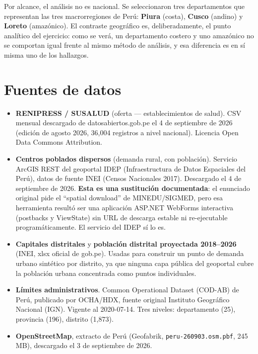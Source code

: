 \documentclass[11pt]{article}
\begin{document}
Por alcance, el an\'alisis no es nacional. Se seleccionaron tres
departamentos que representan las tres macrorregiones de Per\'u: \textbf{
Piura} (costa), \textbf{Cusco} (andino) y \textbf{Loreto} (amaz\'onico). El
contraste geogr\'afico es, deliberadamente, el punto anal\'itico del
ejercicio: como se ver\'a, un departamento costero y uno amaz\'onico no se
comportan igual frente al mismo m\'etodo de an\'alisis, y esa diferencia es
en s\'i misma uno de los hallazgos.

\section{Fuentes de datos}

\begin{itemize}
  \item \textbf{RENIPRESS / SUSALUD} (oferta --- establecimientos de
  salud). CSV mensual descargado de datosabiertos.gob.pe el 4 de
  septiembre de 2026 (edici\'on de agosto 2026, 36{,}004 registros a nivel
  nacional). Licencia Open Data Commons Attribution.
  \item \textbf{Centros poblados dispersos} (demanda rural, con
  poblaci\'on). Servicio ArcGIS REST del geoportal IDEP (Infraestructura de
  Datos Espaciales del Per\'u), datos de fuente INEI (Censos Nacionales
  2017). Descargado el 4 de septiembre de 2026. \textbf{Esta es una
  sustituci\'on documentada}: el enunciado original pide el ``spatial
  download'' de MINEDU/SIGMED, pero esa herramienta result\'o ser una
  aplicaci\'on ASP.NET WebForms interactiva (postbacks y ViewState) sin
  URL de descarga estable ni re-ejecutable program\'aticamente. El
  servicio del IDEP s\'i lo es.
  \item \textbf{Capitales distritales} y \textbf{poblaci\'on distrital
  proyectada 2018--2026} (INEI, xlsx oficial de gob.pe). Usadas para
  construir un punto de demanda urbano sint\'etico por distrito, ya que
  ninguna capa p\'ublica del geoportal cubre la poblaci\'on urbana
  concentrada como puntos individuales.
  \item \textbf{L\'imites administrativos}. Common Operational Dataset
  (COD-AB) de Per\'u, publicado por OCHA/HDX, fuente original Instituto
  Geogr\'afico Nacional (IGN). Vigente al 2020-07-14. Tres niveles:
  departamento (25), provincia (196), distrito (1{,}873).
  \item \textbf{OpenStreetMap}, extracto de Per\'u (Geofabrik,
  \texttt{peru-260903.osm.pbf}, 245\,MB), descargado el 3 de septiembre de
  2026.
\end{itemize}
\end{document}
